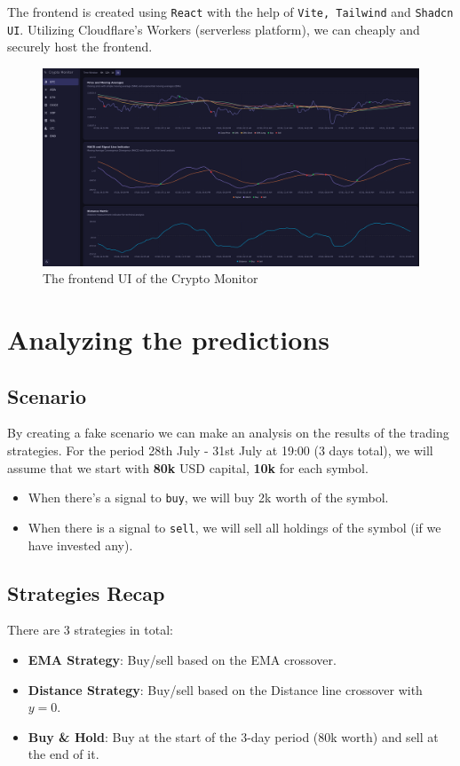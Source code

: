 \documentclass{article}
\begin{document}
The frontend is created using \texttt{React} with the help of \texttt{Vite, Tailwind} and \texttt{Shadcn UI}.
Utilizing Cloudflare's Workers (serverless platform), we can cheaply and securely host the frontend.

\begin{figure}[H]
    \centering
    \includegraphics[width=1\textwidth]{UI-full.png}
    \caption{The frontend UI of the Crypto Monitor}
    \label{alg:ui-full}
\end{figure}


\section{Analyzing the predictions}

\subsection{Scenario}
By creating a fake scenario we can make an analysis on the results of the trading strategies.
For the period 28th July - 31st July at 19:00 (3 days total), we will assume that we start with 
\textbf{80k} USD capital, \textbf{10k} for each symbol. 

\begin{itemize}
    \item When there's a signal to \texttt{buy}, we will buy 2k worth of the symbol.
    \item When there is a signal to \texttt{sell}, we will sell all holdings of the symbol (if we have invested any).
\end{itemize}

\subsection{Strategies Recap}
There are 3 strategies in total:
\begin{itemize}
    \item \textbf{EMA Strategy}: Buy/sell based on the EMA crossover.
    \item \textbf{Distance Strategy}: Buy/sell based on the Distance line crossover with $y=0$.
    \item \textbf{Buy \& Hold}: Buy at the start of the 3-day period (80k worth) and sell at the end of it.
\end{itemize}
\end{document}
